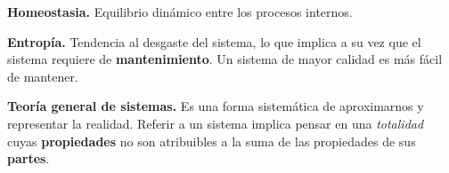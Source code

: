 \documentclass{article}
\begin{document}
\textbf{Homeostasia.} Equilibrio dinámico entre los procesos internos.

\textbf{Entropía.} Tendencia al desgaste del sistema, lo que implica a su vez 
que el sistema requiere de \textbf{mantenimiento}. Un sistema de mayor calidad 
es más fácil de mantener.

\textbf{Teoría general de sistemas.} Es una forma sistemática de aproximarnos y
representar la realidad. Referir a un sistema implica pensar en una 
\textit{totalidad} cuyas \textbf{propiedades }no son atribuibles a la suma de 
las propiedades de sus \textbf{partes}.
\end{document}
